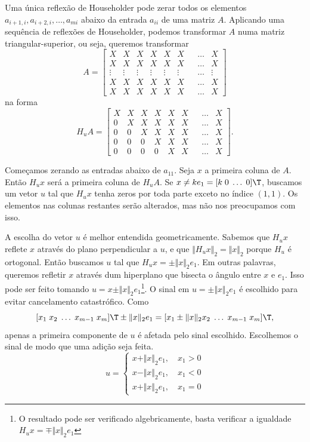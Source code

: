 \documentclass{article}
\begin{document}
Uma única reflexão de Householder pode zerar todos os elementos \(a_{i+1,i}, a_{i+2,i}, \ldots, a_{mi}\) abaixo da entrada \(a_{ii}\) de uma matriz \(A\). Aplicando uma sequência de reflexões de Householder, podemos transformar \(A\) numa matriz triangular-superior, ou seja, queremos transformar
\[
    A = \begin{bmatrix}
        X & X & X & X & X & X & & \ldots & X \\
        X & X & X & X & X & X & & \ldots & X \\
        \vdots & \vdots & \vdots & \vdots & \vdots & \vdots & & \ldots & \vdots \\
        X & X & X & X & X & X & & \ldots & X \\
        X & X & X & X & X & X & & \ldots & X
    \end{bmatrix}
\]
na forma
\[
    H_uA = \begin{bmatrix}
        X & X & X & X & X & X & & \ldots & X \\
        0 & X & X & X & X & X & & \ldots & X \\
        0 & 0 & X & X & X & X & & \ldots & X \\
        0 & 0 & 0 & X & X & X & & \ldots & X \\
        0 & 0 & 0 & 0 & X & X & & \ldots & X
    \end{bmatrix}.
\]

Começamos zerando as entradas abaixo de \(a_{11}\). Seja \(x\) a primeira coluna de \(A\). Então \(H_ux\) será a primeira coluna de \(H_uA\). Se \(x \neq ke_1 = [k \; 0 \; \ldots \; 0]\T \), buscamos um vetor \(u\) tal que \(H_ux\) tenha zeros por toda parte exceto no índice \((1,1)\). Os elementos nas colunas restantes serão alterados, mas não nos preocupamos com isso.

A escolha do vetor \(u\) é melhor entendida geometricamente. Sabemos que \(H_ux\) reflete \(x\) através do plano perpendicular a \(u\), e que \(\Vert H_ux \Vert_2 = \Vert x \Vert_2\) porque \(H_u\) é ortogonal. Então buscamos \(u\) tal que \(H_ux = \pm \Vert x \Vert_2 e_1\). Em outras palavras, queremos refletir \(x\) através dum hiperplano que bisecta o ângulo entre \(x\) e \(e_1\). Isso pode ser feito tomando \(u = x \pm \Vert x \Vert_2 e_1\)\footnote{O resultado pode ser verificado algebricamente, basta verificar a igualdade \(H_ux = \mp \Vert x \Vert_2 e_1\)}. O sinal em \(u = \pm \Vert x \Vert_2 e_1\) é escolhido para evitar cancelamento catastrófico. Como
\[
    [x_1 \; x_2 \; \ldots \; x_{m-1} \; x_m]\T  \pm \Vert x \Vert_2 e_1 = [x_1 \pm \Vert x \Vert_2 x_2 \; \ldots \; x_{m-1} \; x_m]\T ,
\]
apenas a primeira componente de \(u\) é afetada pelo sinal escolhido. Escolhemos o sinal de modo que uma adição seja feita.
\[
    u = \begin{cases}
        x + \Vert x \Vert_2 e_1, \quad x_1 > 0 \\
        x - \Vert x \Vert_2 e_1, \quad x_1 < 0 \\
        x + \Vert x \Vert_2 e_1, \quad x_1 = 0
    \end{cases}
\]
\end{document}
